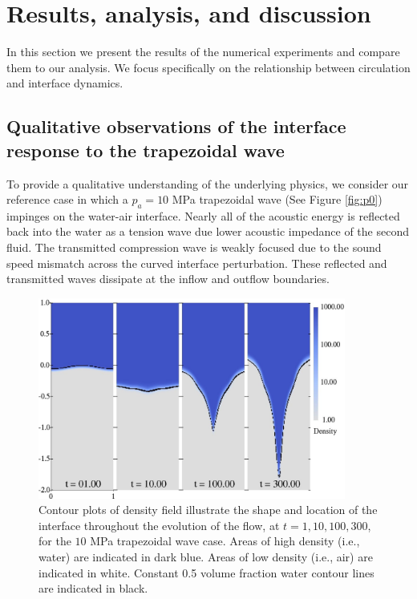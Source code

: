 \section{Results, analysis, and discussion}%
\label{sec:results}%
%
In this section we present the results of the numerical experiments
and compare them to our analysis. We focus specifically on the
relationship between circulation and interface dynamics.
%
%
\subsection{Qualitative observations of the interface response to the trapezoidal wave}
\label{subsec:Qualitative}
To provide a qualitative understanding of the underlying physics, we
consider our reference case in which a $p_a=10$ MPa trapezoidal wave
(See Figure \ref{fig:p0}) impinges on the water-air interface. Nearly
all of the acoustic energy is reflected back into the
water as a tension wave due lower acoustic impedance of the second
fluid. The transmitted compression wave is weakly focused due to the sound
speed mismatch across the curved interface perturbation. These
reflected and transmitted waves dissipate at the inflow and outflow
boundaries.
%
\begin{figure}[h] 
  \centering
\includegraphics[width=0.9\textwidth]{./figs/lung_figs/snapshots_density_t1}
\caption[The evolution of the acoustically perturbed interface]
{Contour plots of density field illustrate the shape and location of
  the interface throughout the evolution of the flow, at
  $t=1, 10, 100, 300$, for the $10$ MPa trapezoidal wave case. Areas
  of high density (i.e., water) are indicated in dark blue. Areas of
  low density (i.e., air) are indicated in white. Constant 0.5 volume
  fraction water contour lines are indicated in black.}
  \label{fig:interface_snapshots}
\end{figure}
